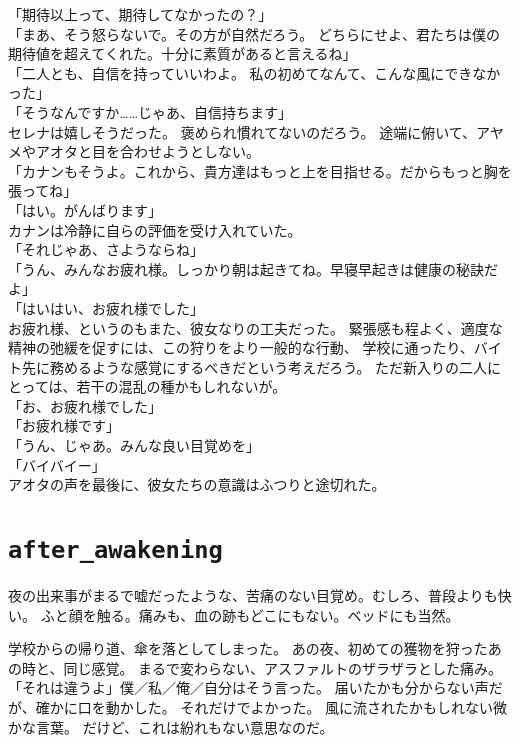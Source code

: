 \documentclass[../IHMain]{subfiles}
\begin{document}
「期待以上って、期待してなかったの？」\\
「まあ、そう怒らないで。その方が自然だろう。
どちらにせよ、君たちは僕の期待値を超えてくれた。十分に素質があると言えるね」\\
「二人とも、自信を持っていいわよ。
私の初めてなんて、こんな風にできなかった」\\
「そうなんですか……じゃあ、自信持ちます」\\
セレナは嬉しそうだった。
褒められ慣れてないのだろう。
途端に俯いて、アヤメやアオタと目を合わせようとしない。\\
「カナンもそうよ。これから、貴方達はもっと上を目指せる。だからもっと胸を張ってね」\\
「はい。がんばります」\\

カナンは冷静に自らの評価を受け入れていた。\\
「それじゃあ、さようならね」\\
「うん、みんなお疲れ様。しっかり朝は起きてね。早寝早起きは健康の秘訣だよ」\\
「はいはい、お疲れ様でした」\\
お疲れ様、というのもまた、彼女なりの工夫だった。
緊張感も程よく、適度な精神の弛緩を促すには、この狩りをより一般的な行動、
学校に通ったり、バイト先に務めるような感覚にするべきだという考えだろう。
ただ新入りの二人にとっては、若干の混乱の種かもしれないが。\\
「お、お疲れ様でした」\\
「お疲れ様です」\\
「うん、じゃあ。みんな良い目覚めを」\\
「バイバイー」\\
アオタの声を最後に、彼女たちの意識はふつりと途切れた。

\clearpage
\thispagestyle{empty}
\section*{\tt after\_awakening}
夜の出来事がまるで嘘だったような、苦痛のない目覚め。むしろ、普段よりも快い。
ふと顔を触る。痛みも、血の跡もどこにもない。ベッドにも当然。

学校からの帰り道、傘を落としてしまった。
あの夜、初めての獲物を狩ったあの時と、同じ感覚。
まるで変わらない、アスファルトのザラザラとした痛み。\\

「それは違うよ」僕／私／俺／自分はそう言った。
届いたかも分からない声だが、確かに口を動かした。
それだけでよかった。
風に流されたかもしれない微かな言葉。
だけど、これは紛れもない意思なのだ。\\
\end{document}
